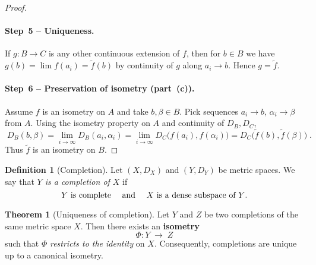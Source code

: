 \documentclass[12pt]{article}
\theoremstyle{definition} %
\newtheorem{theorem}{Theorem}
\newtheorem{definition}{Definition}
\theoremstyle{plain} %
\begin{document}
\begin{proof}
  \paragraph{\textbf{Step 5 – Uniqueness.}}
  If $g:B\to C$ is any other continuous extension of $f$,
  then for $b\in B$ we have $g(b)=\lim f(a_i)=\tilde f(b)$
  by continuity of $g$ along $a_i\to b$.  Hence $g=\tilde f$.

  \paragraph{\textbf{Step 6 – Preservation of isometry (part (c)).}}
  Assume $f$ is an isometry on $A$ and take $b,\beta\in B$.
  Pick sequences $a_i\to b$, $\alpha_i\to\beta$ from $A$.
  Using the isometry property on $A$ and continuity of $D_B,D_C$,
  \[
      \boxed{\;
      D_B(b,\beta)=\lim_{i\to\infty}D_B(a_i,\alpha_i)
                 =\lim_{i\to\infty}D_C\!\bigl(f(a_i),f(\alpha_i)\bigr)
                 =D_C\!\bigl(\tilde f(b),\tilde f(\beta)\bigr)\; }.
  \]
  Thus $\tilde f$ is an isometry on $B$.
\end{proof}

\begin{definition}[Completion]
  Let $(X,D_X)$ and $(Y,D_Y)$ be metric spaces.  
  We say that \emph{$Y$ is a completion of $X$} if
  \[
      \text{$Y$ is complete \quad and \quad $X$ is a dense subspace of $Y$.}
  \]
\end{definition}

\begin{theorem}[Uniqueness of completion]\label{thm:completion_unique}
  Let $Y$ and $Z$ be two completions of the same metric space $X$.
  Then there exists an \textbf{isometry}
  \[
      \Phi:Y\;\longrightarrow\;Z
  \]
  such that $\Phi$ \emph{restricts to the identity} on $X$.
  Consequently, completions are unique up to a canonical isometry.
\end{theorem}
\end{document}
